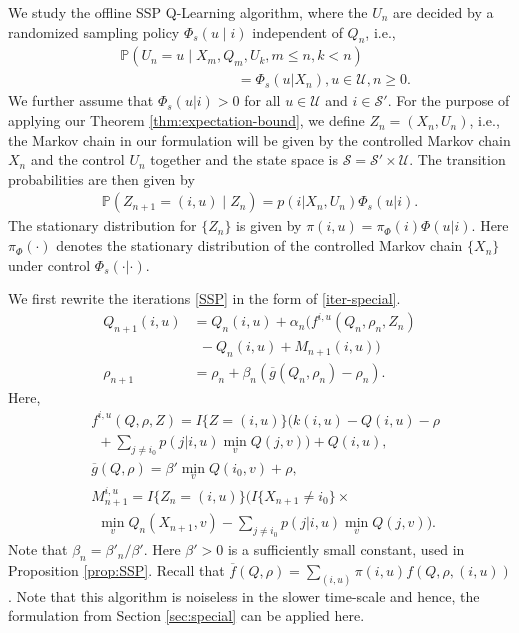 \documentclass[letterpaper, 10 pt, conference]{ieeeconf}  %
\theoremstyle{definition}
\theoremstyle{plain}
\newcommand{\barf}{\overline{f}}
\newcommand{\barg}{\overline{g}}
\newcommand{\Scal}{\mathcal{S}}
\newcommand{\UU}{\mathcal{U}}
\newcommand{\PP}{\mathbb{P}}
\begin{document}
We study the offline SSP Q-Learning algorithm, where the $U_n$ are decided by a randomized sampling policy $\Phi_s(u\mid i)$ independent of $Q_n$, i.e.,  
\begin{align*}
    &\PP(U_n=u\mid X_m, Q_m,U_k,m\leq n,k<n)\\
    &\;\;\;\;\;\;\;\;\;\;\;\;\;\;\;\;\;\;\;\;\;\;\;\;\;\;\;\;\;\;=\Phi_s(u|X_n), u\in\UU,n\geq 0.
\end{align*}
We further assume that $\Phi_s(u|i)>0$ for all $u\in\UU$ and $i\in\Scal'$. For the purpose of applying our Theorem \ref{thm:expectation-bound}, we define $Z_n=(X_n,U_n)$, i.e., the Markov chain in our formulation will be given by the controlled Markov chain $X_n$ and the control $U_n$ together and the state space is $\Scal=\Scal'\times \UU$. The transition probabilities are then given by 
\begin{align*}
    \PP(Z_{n+1}=(i,u)\mid Z_n) = p(i|X_n,U_n)\Phi_s(u|i).
\end{align*}
The stationary distribution for $\{Z_n\}$ is given by $\pi(i,u) =\pi_{\Phi}(i)\Phi(u|i)$. Here $\pi_{\Phi}(\cdot)$ denotes the stationary distribution of the controlled Markov chain $\{X_n\}$ under control $\Phi_s(\cdot|\cdot)$. 

We first rewrite the iterations \eqref{SSP} in the form of \eqref{iter-special}. 
 \begin{align*}
   Q_{n+1}(i,u)&=Q_n(i,u)+\alpha_n(f^{i,u}(Q_n,\rho_n,Z_n)\nonumber\\&~~-Q_{n}(i,u)+M_{n+1}(i,u))\\
    \rho_{n+1}&=\rho_n+\beta_n(\barg(Q_n, \rho_n)-\rho_n).
 \end{align*}
Here, 
\begin{align}\label{SSP-f-g-defn}
    &f^{i,u}(Q,\rho,Z)=I\{Z=(i,u)\}\Big(k(i,u)-Q(i,u)-\rho\nonumber\\&~~+\sum_{j\neq i_0}p(j|i,u)\min_vQ(j,v)\Big)+Q(i,u),\nonumber\\
    &\barg(Q,\rho)=\beta'\min_vQ(i_0,v)+\rho,\nonumber\\
    &M_{n+1}^{i,u}=I\{Z_n=(i,u)\}\Big(I\{X_{n+1}\neq i_0\}\times\nonumber\\
    &~~\min_{v}Q_n(X_{n+1},v)-\sum_{j\neq i_0}p(j|i,u)\min_vQ(j,v)\Big).
\end{align}
Note that $\beta_n=\beta'_n/\beta'$. Here $\beta'>0$ is a sufficiently small constant, used in Proposition \ref{prop:SSP}. Recall that $\barf(Q,\rho)=\sum_{(i,u)}\pi(i,u)f(Q,\rho,(i,u))$. Note that this algorithm is noiseless in the slower time-scale and hence, the formulation from Section \ref{sec:special} can be applied here.
\end{document}
